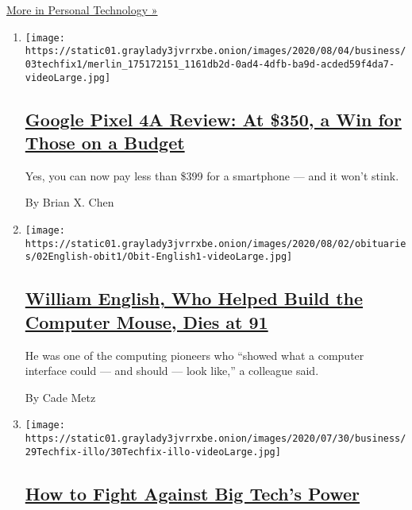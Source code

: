\href{/section/technology/personaltech}{More in Personal Technology »}

\begin{enumerate}
\def\labelenumi{\arabic{enumi}.}
\item
  \texttt{[image: https://static01.graylady3jvrrxbe.onion/images/2020/08/04/business/03techfix1/merlin\_175172151\_1161db2d-0ad4-4dfb-ba9d-acded59f4da7-videoLarge.jpg]}

  \hypertarget{google-pixel-4a-review-at-350-a-win-for-those-on-a-budget}{%
  \subsection{\texorpdfstring{\href{/2020/08/03/technology/personaltech/google-pixel-4a-review.html}{Google
  Pixel 4A Review: At \$350, a Win for Those on a
  Budget}}{Google Pixel 4A Review: At \$350, a Win for Those on a Budget}}\label{google-pixel-4a-review-at-350-a-win-for-those-on-a-budget}}

  Yes, you can now pay less than \$399 for a smartphone --- and it won't
  stink.

  By Brian X. Chen
\item
  \texttt{[image: https://static01.graylady3jvrrxbe.onion/images/2020/08/02/obituaries/02English-obit1/Obit-English1-videoLarge.jpg]}

  \hypertarget{william-english-who-helped-build-the-computer-mouse-dies-at-91}{%
  \subsection{\texorpdfstring{\href{/2020/07/31/technology/william-english-who-helped-build-the-computer-mouse-dies-at-91.html}{William
  English, Who Helped Build the Computer Mouse, Dies at
  91}}{William English, Who Helped Build the Computer Mouse, Dies at 91}}\label{william-english-who-helped-build-the-computer-mouse-dies-at-91}}

  He was one of the computing pioneers who ``showed what a computer
  interface could --- and should --- look like,'' a colleague said.

  By Cade Metz
\item
  \texttt{[image: https://static01.graylady3jvrrxbe.onion/images/2020/07/30/business/29Techfix-illo/30Techfix-illo-videoLarge.jpg]}

  \hypertarget{how-to-fight-against-big-techs-power}{%
  \subsection{\texorpdfstring{\href{/2020/07/29/technology/personaltech/big-tech-power-how-to-fight.html}{How
  to Fight Against Big Tech's
  Power}}{How to Fight Against Big Tech's Power}}\label{how-to-fight-against-big-techs-power}}


\end{enumerate}
